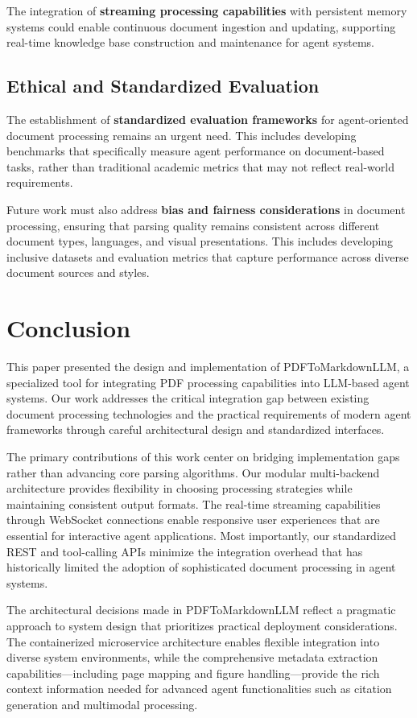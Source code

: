 \documentclass{article}
\begin{document}
The integration of \textbf{streaming processing capabilities} with persistent memory systems could enable continuous document ingestion and updating, supporting real-time knowledge base construction and maintenance for agent systems.

\subsection{Ethical and Standardized Evaluation}

The establishment of \textbf{standardized evaluation frameworks} for agent-oriented document processing remains an urgent need. This includes developing benchmarks that specifically measure agent performance on document-based tasks, rather than traditional academic metrics that may not reflect real-world requirements.

Future work must also address \textbf{bias and fairness considerations} in document processing, ensuring that parsing quality remains consistent across different document types, languages, and visual presentations. This includes developing inclusive datasets and evaluation metrics that capture performance across diverse document sources and styles.

\section{Conclusion}

This paper presented the design and implementation of PDFToMarkdownLLM, a specialized tool for integrating PDF processing capabilities into LLM-based agent systems. Our work addresses the critical integration gap between existing document processing technologies and the practical requirements of modern agent frameworks through careful architectural design and standardized interfaces.

The primary contributions of this work center on bridging implementation gaps rather than advancing core parsing algorithms. Our modular multi-backend architecture provides flexibility in choosing processing strategies while maintaining consistent output formats. The real-time streaming capabilities through WebSocket connections enable responsive user experiences that are essential for interactive agent applications. Most importantly, our standardized REST and tool-calling APIs minimize the integration overhead that has historically limited the adoption of sophisticated document processing in agent systems.

The architectural decisions made in PDFToMarkdownLLM reflect a pragmatic approach to system design that prioritizes practical deployment considerations. The containerized microservice architecture enables flexible integration into diverse system environments, while the comprehensive metadata extraction capabilities—including page mapping and figure handling—provide the rich context information needed for advanced agent functionalities such as citation generation and multimodal processing.
\end{document}
